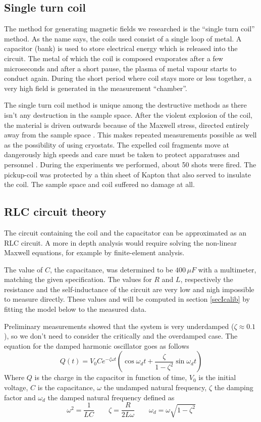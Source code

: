 \subsection{Single turn coil}

The method for generating magnetic fields we researched is the ``single 
turn coil'' method. As the name says, the coils used consist of a single 
loop of metal. A capacitor (bank) is used to store electrical energy which 
is released into the circuit. The metal of which the coil is composed 
evaporates after a few microseconds and after a short pause, the plasma of 
metal vapour starts to conduct again. During the short period where coil 
stays more or less together, a very high field is generated in the 
measurement ``chamber''. 

The single turn coil method is unique among the destructive methods as 
there isn't any destruction in the sample space. After the violent 
explosion of the coil, the material is driven outwards because of the 
Maxwell stress, directed entirely away from the sample space 
\cite{herlachArticle}.  This makes repeated measurements possible as well 
as the possibility of using cryostats. The expelled coil fragments move at 
dangerously high speeds and care must be taken to protect apparatuses and 
personnel \cite{singleTurn}. During the experiments we performed, about 50 
shots were fired. The pickup-coil was protected by a thin sheet of Kapton 
that also served to insulate the coil. The sample space and coil suffered 
no damage at all.

\subsection{RLC circuit theory}

The circuit containing the coil and the capacitator can be approximated as an 
RLC circuit. A more in depth analysis would require solving the non-linear 
Maxwell equations, for example by finite-element 
analysis.\cite{herlachArticle}

The value of $C$, the capacitance, was determined to be $400\,\mu F$ with a 
multimeter, matching the given specification. The values for $R$ and $L$, 
respectively the resistance and the self-inductance of the circuit are very low 
and nigh impossible to measure directly. These values and will be computed in 
section \ref{secIcalib} by fitting the model below to the measured data.

Preliminary measurements showed that the system is very underdamped ($\zeta 
\approx 0.1$), so we don't need to consider the critically and the 
overdamped case.  The equation for the damped harmonic oscillator goes as 
follows \cite{serway}
\begin{equation}
Q(t) = V_0 C e^{-\zeta \omega t} \left( \cos{\omega_d t} + \frac{\zeta} 
{1-\zeta^2} \sin{\omega_d t}\right)
\end{equation}
Where $Q$ is the charge in the capacitor in function of time, $V_0$ is the 
initial voltage, $C$ is the capacitance, $\omega$ the undamped natural 
frequency, $\zeta$ the damping factor and $\omega_d$ the damped natural 
frequency defined as
$$
\omega^2 = \frac{1}{LC} \qquad
\zeta = \frac{R}{2L \omega} \qquad
\omega_d = \omega \sqrt{1-\zeta^2}
$$

